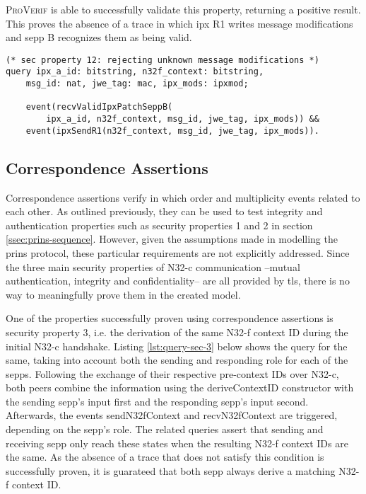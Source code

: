 \textsc{ProVerif} is able to successfully validate this property, returning a positive result.
This proves the absence of a trace in which \gls{ipx} R1 writes message modifications and \gls{sepp} B recognizes them as being valid.

\begin{lstlisting}[caption={Query for security property 12},label={lst:query-sec-12},firstnumber=375]
(* sec property 12: rejecting unknown message modifications *)
query ipx_a_id: bitstring, n32f_context: bitstring,
    msg_id: nat, jwe_tag: mac, ipx_mods: ipxmod;

    event(recvValidIpxPatchSeppB(
        ipx_a_id, n32f_context, msg_id, jwe_tag, ipx_mods)) &&
    event(ipxSendR1(n32f_context, msg_id, jwe_tag, ipx_mods)).
\end{lstlisting}

\subsection{Correspondence Assertions}
\label{ssec:correspondence}

Correspondence assertions verify in which order and multiplicity events related to each other.
As outlined previously, they can be used to test integrity and authentication properties such as security properties 1 and 2 in section \ref{ssec:prins-sequence}.
However, given the assumptions made in modelling the \gls{prins} protocol, these particular requirements are not explicitly addressed.
Since the three main security properties of N32-c communication --mutual authentication, integrity and confidentiality-- are all provided by \gls{tls}, there is no way to meaningfully prove them in the created model.

One of the properties successfully proven using correspondence assertions is security property 3, i.e. the derivation of the same N32-f context ID during the initial N32-c handshake.
Listing \ref{lst:query-sec-3} below shows the query for the same, taking into account both the sending and responding role for each of the \glspl{sepp}.
Following the exchange of their respective pre-context IDs over N32-c, both peers combine the information using the {\sffamily deriveContextID} constructor with the sending \gls{sepp}'s input first and the responding \gls{sepp}'s input second.
Afterwards, the events {\sffamily sendN32fContext} and {\sffamily recvN32fContext} are triggered, depending on the \gls{sepp}'s role.
The related queries assert that sending and receiving \gls{sepp} only reach these states when the resulting N32-f context IDs are the same.
As the absence of a trace that does not satisfy this condition is successfully proven, it is guarateed that both \gls{sepp} always derive a matching N32-f context ID.

